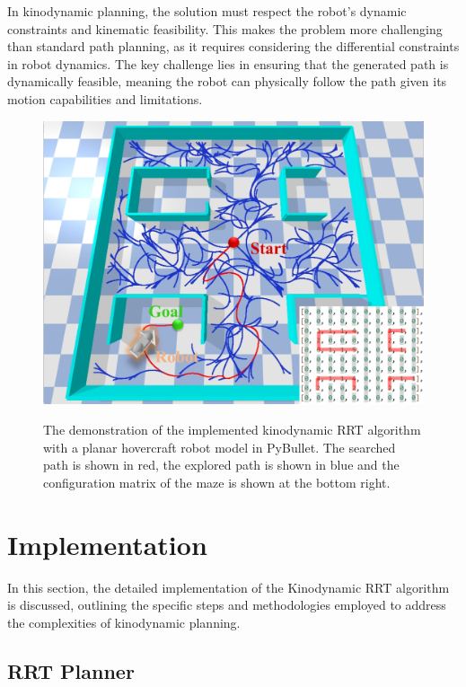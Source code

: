 \documentclass[11pt, conference]{IEEEtran}
\begin{document}
In kinodynamic planning, the solution must respect the robot's dynamic constraints and kinematic feasibility\cite{donald1993kinodynamic}. This makes the problem more challenging than standard path planning, as it requires considering the differential constraints in robot dynamics. The key challenge lies in ensuring that the generated path is dynamically feasible, meaning the robot can physically follow the path given its motion capabilities and limitations.


\begin{figure}[htb]
    \centering
        \textsf{\includegraphics[width=0.9\columnwidth]{figures/env_setup.png}}
        \caption{The demonstration of the implemented kinodynamic RRT algorithm with a planar hovercraft robot model in PyBullet. The searched path is shown in red, the explored path is shown in blue and the configuration matrix of the maze is shown at the bottom right.}
        \label{fig:env}
\end{figure}


\section{Implementation}
In this section, the detailed implementation of the Kinodynamic RRT algorithm is discussed, outlining the specific steps and methodologies employed to address the complexities of kinodynamic planning.

\subsection{RRT Planner}
\end{document}

